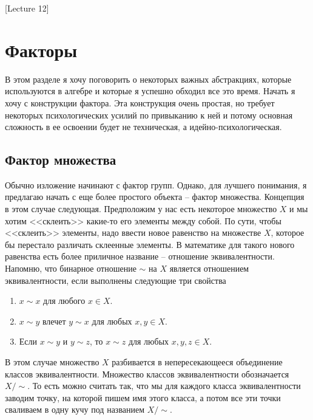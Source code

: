 [Lecture 12]


\section{Факторы}

В этом разделе я хочу поговорить о некоторых важных абстракциях, которые используются в алгебре и которые я успешно обходил все это время.
Начать я хочу с конструкции фактора.
Эта конструкция очень простая, но требует некоторых психологических усилий по привыканию к ней и потому основная сложность в ее освоении будет не техническая, а идейно-психологическая.

\subsection{Фактор множества}

Обычно изложение начинают с фактор групп.
Однако, для лучшего понимания, я предлагаю начать с еще более простого объекта -- фактор множества.
Концепция в этом случае следующая.
Предположим у нас есть некоторое множество $X$ и мы хотим <<склеить>> какие-то его элементы между собой.
По сути, чтобы <<склеить>> элементы, надо ввести новое равенство на множестве $X$, которое бы перестало различать склеенные элементы.
В математике для такого нового равенства есть более приличное название -- отношение эквивалентности.
Напомню, что бинарное отношение $\sim$ на $X$ является отношением эквивалентности, если выполнены следующие три свойства
\begin{enumerate}
\item $x\sim x$ для любого $x\in X$.

\item $x\sim y$ влечет $y \sim x$ для любых $x,y\in X$.

\item Если $x \sim y$ и $y \sim z$, то $x \sim z$ для любых $x,y, z\in X$.
\end{enumerate}
В этом случае множество $X$ разбивается в непересекающееся объединение классов эквивалентности.
Множество классов эквивалентности обозначается $X/{\sim}$.
То есть можно считать так, что мы для каждого класса эквивалентности заводим точку, на которой пишем имя этого класса, а потом все эти точки сваливаем в одну кучу под названием $X/{\sim}$.

